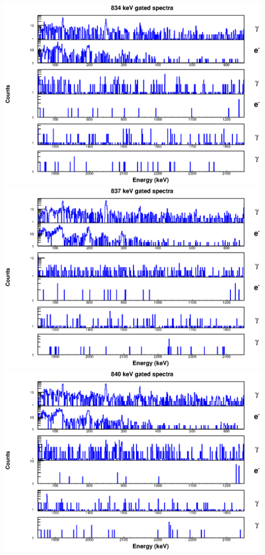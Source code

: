 \includegraphics[scale=0.8]{154Gd_Appendix/834_combined.eps}
\includegraphics[scale=0.8]{154Gd_Appendix/837_combined.eps}
\includegraphics[scale=0.8]{154Gd_Appendix/840_combined.eps}
